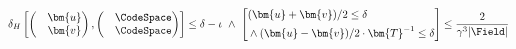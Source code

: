 \[
    \delta_H \left[
    \begin{pmatrix}
    & \bm{u} \\
    & \bm{v}
    \end{pmatrix}
    ,
    \begin{pmatrix}
    & \CodeSpace\\
    & \CodeSpace
    \end{pmatrix}
    \right]
    \le \delta - \iota
    ~\wedge~
    \left[
    \begin{aligned}
    & (\bm{u} + \bm{v})/2 \le \delta \\
    & \wedge (\bm{u} - \bm{v})/2 \cdot \bm{T}^{-1} \le \delta
    \end{aligned}
    \right]
     \le \frac{2}{\gamma^3 |\Field|}
\]


















